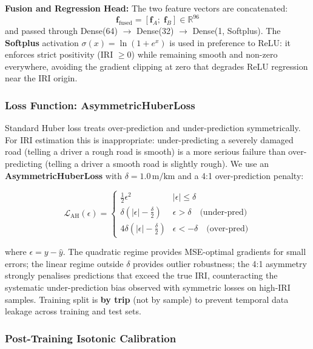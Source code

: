 \documentclass[conference]{IEEEtran}
\begin{document}
\textbf{Fusion and Regression Head:} The two feature vectors are concatenated:
\begin{equation}
\label{eq:fusion}
\mathbf{f}_{\text{fused}} = [\mathbf{f}_A;\; \mathbf{f}_B] \in \mathbb{R}^{96}
\end{equation}
and passed through Dense(64) $\to$ Dense(32) $\to$ Dense(1, Softplus).
The \textbf{Softplus} activation $\sigma(x) = \ln(1 + e^x)$ is used in preference to ReLU: it enforces strict positivity (IRI $\geq 0$) while remaining smooth and non-zero everywhere, avoiding the gradient clipping at zero that degrades ReLU regression near the IRI origin.

\subsubsection{Loss Function: AsymmetricHuberLoss}

Standard Huber loss treats over-prediction and under-prediction symmetrically.
For IRI estimation this is inappropriate: under-predicting a severely damaged road (telling a driver a rough road is smooth) is a more serious failure than over-predicting (telling a driver a smooth road is slightly rough).
We use an \textbf{AsymmetricHuberLoss} with $\delta = 1.0\,\text{m/km}$ and a 4:1 over-prediction penalty:

\begin{equation}
\label{eq:asym_huber}
\mathcal{L}_{\text{AH}}(\epsilon) =
\begin{cases}
\frac{1}{2}\epsilon^2 & |\epsilon| \leq \delta \\
\delta\!\left(|\epsilon| - \tfrac{\delta}{2}\right) & \epsilon > \delta \quad \text{(under-pred)} \\
4\delta\!\left(|\epsilon| - \tfrac{\delta}{2}\right) & \epsilon < -\delta \quad \text{(over-pred)}
\end{cases}
\end{equation}

where $\epsilon = y - \hat{y}$.
The quadratic regime provides MSE-optimal gradients for small errors; the linear regime outside $\delta$ provides outlier robustness;
the 4:1 asymmetry strongly penalises predictions that exceed the true IRI, counteracting the systematic under-prediction bias observed with symmetric losses on high-IRI samples.
Training split is \textbf{by trip} (not by sample) to prevent temporal data leakage across training and test sets.

\subsubsection{Post-Training Isotonic Calibration}
\end{document}
